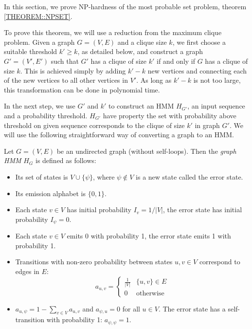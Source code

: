 In this section, we prove NP-hardness of the most probable set problem, theorem \ref{THEOREM::NPSET}.

To prove this theorem, we will use a reduction from the maximum clique
problem.  Given a graph $G=(V,E)$ and a clique
size $k$, we first choose a suitable threshold $k'\ge k$, as
detailed below, and construct a graph $G'=(V',E')$ such that $G'$ has
a clique of size $k'$ if and only if $G$ has a clique of size
$k$. This is achieved simply by adding $k'-k$ new vertices and
connecting each of the new vertices to all other vertices in $V'$.
As long as $k'-k$ is not too large, this transformation can be done in
polynomial time.

In the next step, we use $G'$ and $k'$ to construct an HMM $H_{G'}$, an input
sequence and a probability threshold. $H_{G'}$ have property the set with
probability above threshold on given sequence corresponds to the clique of size
$k'$ in graph $G'$. We will use the following
straightforward way of converting a graph to an HMM.

\begin{definition}\label{GraphHMM}
Let $G=(V,E)$ be an undirected graph (without self-loops). 
Then the \emph{graph HMM} $H_G$ is defined as follows:
\begin{itemize}[itemsep=-1mm]
\item Its set of states is $V\cup \{\psi\}$, where $\psi\notin V$ is a
  new state called the error state.
\item Its emission alphabet is $\{0,1\}$.
\item Each state $v\in V$ has initial probability $I_{v} = 1/|V|$, the
error state has initial probability $I_{\psi}=0$.
\item Each state $v\in V$ emits 0 with probability 1, the error state emits 1 
with probability 1.
\item Transitions with non-zero probability between states $u,v\in V$
  correspond to edges in $E$:
$$a_{u,v}=\begin{cases}
\frac1{|V|} & \{u,v\}\in E\\
0 & \text{otherwise}
\end{cases}$$
\item $a_{u,\psi}=1-\sum_{v\in V}a_{u,v}$
and $a_{\psi,u}=0$ for all $u\in V$. The error state has a self-transition with
probability 1: $a_{\psi,\psi}=1$.
\end{itemize}
\end{definition}

